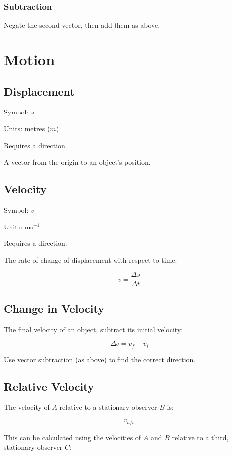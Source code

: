 \documentclass[a4paper,11pt]{article}
\begin{document}
\subsubsection{Subtraction}

Negate the second vector, then add them as above.




\section{Motion}

\subsection{Displacement}

Symbol: $s$

Units: metres ($m$)

Requires a direction.

A vector from the origin to an object's position.


\subsection{Velocity}

Symbol: $v$

Units: $\mbox{ms}^{-1}$

Requires a direction.

The rate of change of displacement with respect to time:

$$
v = \frac{\Delta s}{\Delta t}
$$


\subsection{Change in Velocity}

The final velocity of an object, subtract its initial velocity:

$$
\Delta v = v_f - v_i
$$

Use vector subtraction (as above) to find the correct direction.


\subsection{Relative Velocity}

The velocity of $A$ relative to a stationary observer $B$ is:

$$
v_{a/b}
$$

This can be calculated using the velocities of $A$ and $B$ relative to a third,
stationary observer $C$:
\end{document}
